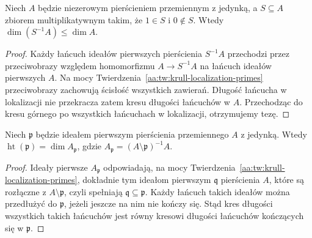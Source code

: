 \begin{wniosek}
\label{aa:cor:krull-localization-bound}
Niech $A$ będzie niezerowym pierścieniem przemiennym z jedynką,
a $S\subseteq A$ zbiorem multiplikatywnym takim, że
$1\in S$ i $0\notin S$. Wtedy
$\dim(S^{-1}A)\le\dim A$.
\end{wniosek}
\begin{proof}
Każdy łańcuch ideałów pierwszych pierścienia $S^{-1}A$
przechodzi przez przeciwobrazy względem homomorfizmu
$A\to S^{-1}A$ na łańcuch ideałów pierwszych $A$.
Na mocy Twierdzenia~\ref{aa:tw:krull-localization-primes}
przeciwobrazy zachowują ścisłość wszystkich zawierań.
Długość łańcucha w lokalizacji nie przekracza zatem
kresu długości łańcuchów w $A$. Przechodząc do kresu
górnego po wszystkich łańcuchach w lokalizacji, otrzymujemy tezę.
\end{proof}
\begin{wniosek}\label{aa:cor:krull-height-local}
Niech $\mathfrak p$ będzie ideałem pierwszym pierścienia
przemiennego $A$ z jedynką. Wtedy
$\operatorname{ht}(\mathfrak p)=\dim A_{\mathfrak p}$,
gdzie $A_{\mathfrak p}=(A\setminus\mathfrak p)^{-1}A$.
\end{wniosek}
\begin{proof}
Ideały pierwsze $A_{\mathfrak p}$ odpowiadają, na mocy
Twierdzenia~\ref{aa:tw:krull-localization-primes}, dokładnie tym
ideałom pierwszym $\mathfrak q$ pierścienia $A$, które są rozłączne
z $A\setminus\mathfrak p$, czyli spełniają
$\mathfrak q\subseteq\mathfrak p$.
Każdy łańcuch takich ideałów można przedłużyć do
$\mathfrak p$, jeżeli jeszcze na nim nie kończy się.
Stąd kres długości wszystkich takich łańcuchów jest
równy kresowi długości łańcuchów kończących się w $\mathfrak p$.
\end{proof}

